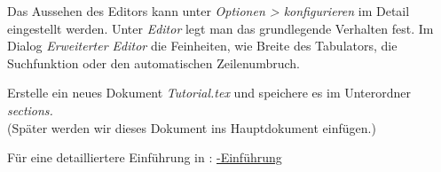 Das Aussehen des Editors kann unter \textit{Optionen > \texstud konfigurieren}
im Detail eingestellt werden. Unter \textit{Editor} legt man das grundlegende Verhalten fest. Im Dialog \textit{Erweiterter Editor} die Feinheiten, wie Breite des Tabulators, die Suchfunktion oder den automatischen Zeilenumbruch.

\begin{aufgabe}
	Erstelle ein neues Dokument \textit{\glqq Tutorial.tex\grqq{}} und speichere es im Unterordner \textit{\glqq sections\grqq.}\\(Später werden wir dieses Dokument ins Hauptdokument einfügen.)
\end{aufgabe}

%
Für eine detailliertere Einführung in \texstud : \href{http://www.mi.uni-koeln.de/wp-MIEDV/wp-content/uploads/2016/05/dokumentNeuYP.pdf}{{\color{blue}\texstud -Einführung}}
